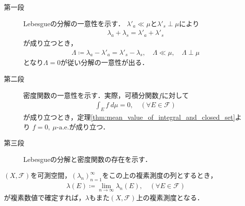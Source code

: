 	\begin{prf}\mbox{}
		\begin{description}
			\item[第一段] Lebesgueの分解の一意性を示す．
				$\lambda'_a \ll \mu$と$\lambda'_s \perp \mu$により
				\begin{align}
					\lambda_a + \lambda_s = \lambda'_a + \lambda'_s
				\end{align}
				が成り立つとき，
				\begin{align}
					\Lambda \coloneqq \lambda_a - \lambda'_a = \lambda'_s - \lambda_s,
					\quad \Lambda \ll \mu,
					\quad \Lambda \perp \mu
				\end{align}
				となり$\Lambda = 0$が従い分解の一意性が出る．
			
			\item[第二段] 密度関数の一意性を示す．実際，可積分関数$f$に対して
				\begin{align}
					\int_E f\ d\mu = 0, \quad (\forall E \in \mathscr{F})
				\end{align}
				が成り立つとき，定理\ref{thm:mean_value_of_integral_and_closed_set}より
				$f = 0,\ \mbox{$\mu$-a.e.}$が成り立つ．
				
			\item[第三段] Lebesgueの分解と密度関数の存在を示す．
				
		\end{description}
	\end{prf}
	
	\begin{screen}
		\begin{thm}\label{thm;Vitali_Hahn_Saks}
			$(X,\mathscr{F})$を可測空間，$(\lambda_n)_{n=1}^\infty$をこの上の複素測度の列とするとき，
			\begin{align}
				\lambda(E) \coloneqq \lim_{n \to \infty} \lambda_n(E),
				\quad (\forall E \in \mathscr{F})
				\label{eq:thm_Vitali_Hahn_Saks}
			\end{align}
			が複素数値で確定すれば，$\lambda$もまた$(X,\mathscr{F})$上の複素測度となる．
		\end{thm}
	\end{screen}
	
